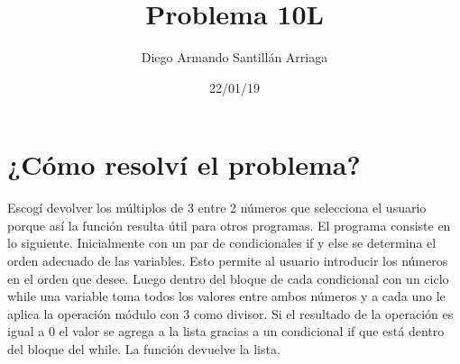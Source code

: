 \documentclass[letterpaper, 12pt, oneside]{article}%
\title{\Huge Problema 10L}
\author{Diego Armando Santillán Arriaga}
\date{22/01/19}
\begin{document}
\maketitle
\newpage
\section*{¿Cómo resolví el problema?}
Escogí devolver los múltiplos de 3 entre 2 números que selecciona el usuario porque así la función resulta útil para otros programas. El programa consiste en lo siguiente. Inicialmente con un par de condicionales if y else se determina el orden adecuado de las variables. Esto permite al usuario introducir los números en el orden que desee. Luego dentro del bloque de cada condicional con un ciclo while una variable toma todos los valores entre ambos números y a cada uno le aplica la operación módulo con 3 como divisor. Si el resultado de la operación es igual a 0 el valor se agrega a la lista gracias a un condicional if que está dentro del bloque del while. La función devuelve la lista. 
\end{document}
